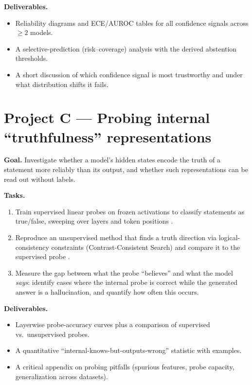 \documentclass[11pt]{article}
\begin{document}
\textbf{Deliverables.}
\begin{itemize}[leftmargin=*]
  \item Reliability diagrams and ECE/AUROC tables for all confidence signals
    across $\geq 2$ models.
  \item A selective-prediction (risk--coverage) analysis with the derived
    abstention thresholds.
  \item A short discussion of which confidence signal is most trustworthy and
    under what distribution shifts it fails.
\end{itemize}

\section{Project C --- Probing internal ``truthfulness'' representations}

\textbf{Goal.} Investigate whether a model's hidden states encode the truth of a
statement more reliably than its output, and whether such representations can be
read out without labels.

\textbf{Tasks.}
\begin{enumerate}[leftmargin=*]
  \item Train supervised linear probes on frozen activations to classify
    statements as true/false, sweeping over layers and token positions
    \citep{azaria2023internal}.
  \item Reproduce an unsupervised method that finds a truth direction via
    logical-consistency constraints (Contrast-Consistent Search) and compare it
    to the supervised probe \citep{burns2023discovering}.
  \item Measure the gap between what the probe ``believes'' and what the model
    \emph{says}: identify cases where the internal probe is correct while the
    generated answer is a hallucination, and quantify how often this occurs.
\end{enumerate}

\textbf{Deliverables.}
\begin{itemize}[leftmargin=*]
  \item Layerwise probe-accuracy curves plus a comparison of supervised vs.\
    unsupervised probes.
  \item A quantitative ``internal-knows-but-outputs-wrong'' statistic with
    examples.
  \item A critical appendix on probing pitfalls (spurious features, probe
    capacity, generalization across datasets).
\end{itemize}
\end{document}
